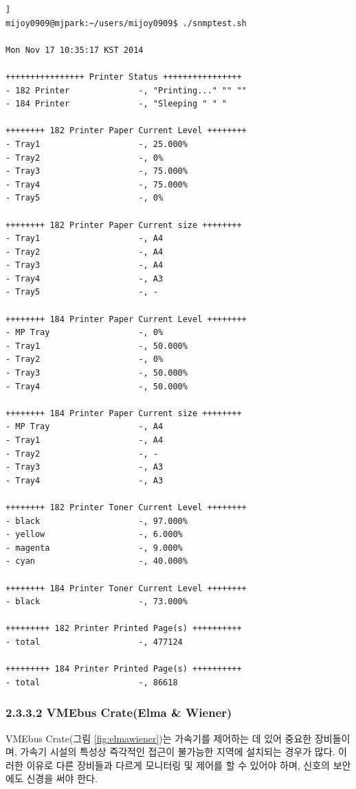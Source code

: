 \documentclass[11pt
  , a4paper
  , article
  , oneside
]{memoir}
\begin{document}
\begin{lstlisting}[style=termstyle, caption=Xerox \& Kyocera사 Printer 모니터링 결과]]
mijoy0909@mjpark:~/users/mijoy0909$ ./snmptest.sh 
 
Mon Nov 17 10:35:17 KST 2014
 
++++++++++++++++ Printer Status ++++++++++++++++
- 182 Printer              -, "Printing..." "" ""
- 184 Printer              -, "Sleeping " " "
 
++++++++ 182 Printer Paper Current Level ++++++++
- Tray1                    -, 25.000%
- Tray2                    -, 0%
- Tray3                    -, 75.000%
- Tray4                    -, 75.000%
- Tray5                    -, 0%
 
++++++++ 182 Printer Paper Current size ++++++++
- Tray1                    -, A4
- Tray2                    -, A4
- Tray3                    -, A4
- Tray4                    -, A3
- Tray5                    -, -
 
++++++++ 184 Printer Paper Current Level ++++++++
- MP Tray                  -, 0%
- Tray1                    -, 50.000%
- Tray2                    -, 0%
- Tray3                    -, 50.000%
- Tray4                    -, 50.000%
 
++++++++ 184 Printer Paper Current size ++++++++
- MP Tray                  -, A4
- Tray1                    -, A4
- Tray2                    -, -
- Tray3                    -, A3
- Tray4                    -, A3
 
++++++++ 182 Printer Toner Current Level ++++++++
- black                    -, 97.000%
- yellow                   -, 6.000%
- magenta                  -, 9.000%
- cyan                     -, 40.000%
 
++++++++ 184 Printer Toner Current Level ++++++++
- black                    -, 73.000%
 
+++++++++ 182 Printer Printed Page(s) ++++++++++
- total                    -, 477124
 
+++++++++ 184 Printer Printed Page(s) ++++++++++
- total                    -, 86618
\end{lstlisting}


\subsubsection{2.3.3.2 VMEbus Crate(Elma \& Wiener)}
VMEbus Crate(그림 \ref{fig:elmawiener})는 가속기를 제어하는 데 있어 중요한 장비들이며, 가속기 시설의 특성상 즉각적인 접근이 불가능한 지역에 설치되는 경우가 많다. 이러한 이유로 다른 장비들과 다르게 모니터링 및 제어를 할 수 있어야 하며, 신호의 보안에도 신경을 써야 한다.
\end{document}
